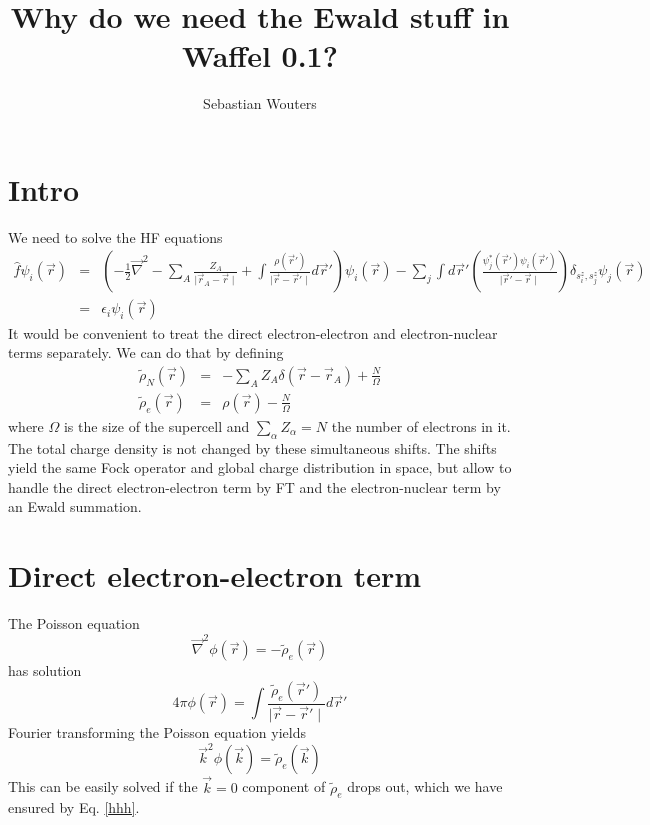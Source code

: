 \documentclass[11pt,a4paper]{article}
\author{Sebastian Wouters}
\title{Why do we need the Ewald stuff in Waffel 0.1?}
\begin{document}
\maketitle
\section{Intro}
We need to solve the HF equations
\begin{eqnarray}
\hat{f} \psi_i(\vec{r}) & = & \left( - \frac{1}{2} \vec{\nabla}^2 - \sum\limits_{A} \frac{Z_A}{\mid \vec{r}_A - \vec{r} \mid} + \int \frac{\rho(\vec{r}')}{\mid \vec{r} - \vec{r}' \mid} d\vec{r}' \right) \psi_i(\vec{r}) - \sum\limits_j \int d\vec{r}' \left( \frac{\psi_j^*(\vec{r}') \psi_i(\vec{r}')}{\mid \vec{r}' - \vec{r} \mid} \right) \delta_{s^z_i,s^z_j} \psi_j(\vec{r})\nonumber\\
& = & \epsilon_i \psi_i(\vec{r})
\end{eqnarray}
It would be convenient to treat the direct electron-electron and electron-nuclear terms separately. We can do that by defining
\begin{eqnarray}
\tilde{\rho}_N(\vec{r}) & = & - \sum\limits_A Z_A \delta(\vec{r} - \vec{r}_A) + \frac{N}{\Omega} \\
\tilde{\rho}_e(\vec{r}) & = & \rho(\vec{r}) - \frac{N}{\Omega} \label{hhh}
\end{eqnarray}
where $\Omega$ is the size of the supercell and $\sum\limits_{\alpha} Z_{\alpha} = N$ the number of electrons in it. The total charge density is not changed by these simultaneous shifts. The shifts yield the same Fock operator and global charge distribution in space, but allow to handle the direct electron-electron term by FT and the electron-nuclear term by an Ewald summation.

\section{Direct electron-electron term}
The Poisson equation
\begin{equation}
\vec{\nabla}^2 \phi(\vec{r}) = - \tilde{\rho}_e(\vec{r})
\end{equation}
has solution
\begin{equation}
4 \pi \phi(\vec{r}) = \int \frac{\tilde{\rho}_e(\vec{r}')}{\mid \vec{r} - \vec{r}' \mid} d\vec{r}'
\end{equation}
Fourier transforming the Poisson equation yields
\begin{equation}
\vec{k}^2 \phi(\vec{k}) = \tilde{\rho}_e(\vec{k})
\end{equation}
This can be easily solved if the $\vec{k} = 0$ component of $\tilde{\rho}_e$ drops out, which we have ensured by Eq. \eqref{hhh}.
\end{document}
